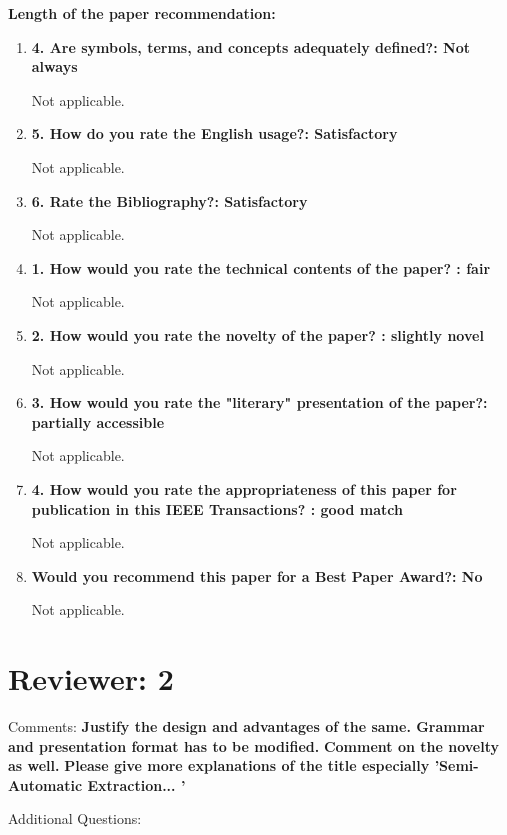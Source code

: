 \documentclass[12pt]{article}
\begin{document}
\textbf{Length of the paper recommendation:}

\begin{enumerate}

\item \textbf{4. Are symbols, terms, and concepts adequately defined?: Not always}

Not applicable.

\item \textbf{5. How do you rate the English usage?: Satisfactory}

Not applicable.

\item \textbf{6. Rate the Bibliography?: Satisfactory}

Not applicable.

\item \textbf{1. How would you rate the technical contents of the paper? : fair}

Not applicable.

\item \textbf{2. How would you rate the novelty of the paper? : slightly novel}

Not applicable.

\item \textbf{3. How would you rate the "literary" presentation of the paper?: partially 
accessible}

Not applicable.

\item \textbf{4. How would you rate the appropriateness of this paper for publication in 
this IEEE Transactions? : good match}

Not applicable.

\item \textbf{Would you recommend this paper for a Best Paper Award?: No}

Not applicable.

\end{enumerate}


\section*{Reviewer: 2}

Comments:
\textbf{Justify the design and advantages of the same. Grammar and presentation format has to be modified.}
\textbf{Comment on the novelty as well.}
\textbf{Please give more explanations of the title especially 'Semi-Automatic Extraction... '}

Additional Questions:
\end{document}
